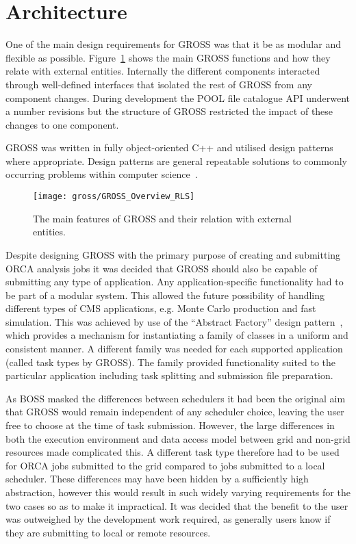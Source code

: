 \section{Architecture}
One of the main design requirements for GROSS was that it be as modular and flexible as possible. Figure~\ref{fig:Orca_Overview} shows the main GROSS functions and how they relate with external entities. Internally the different components interacted through well-defined interfaces that isolated the rest of GROSS from any component changes. During development the POOL file catalogue API underwent a number revisions but the structure of GROSS restricted the impact of these changes to one component.

GROSS was written in fully object-oriented C++ and utilised design patterns where appropriate. Design patterns are general repeatable solutions to commonly occurring problems within computer science~\cite{citeulike:115158}. 

\begin{figure}[!tbp]
  \texttt{[image: gross/GROSS\_Overview\_RLS]}
  \caption{The main features of GROSS and their relation with external entities.~\cite{CHEP04_TALLINI}
  \label{fig:Orca_Overview}}
\end{figure}

Despite designing GROSS with the primary purpose of creating and submitting ORCA analysis jobs it was decided that GROSS should also be capable of submitting any type of application. Any application-specific functionality had to be part of a modular system. This allowed the future possibility of handling different types of CMS applications, e.g. Monte Carlo production and fast simulation. This was achieved by use of the ``Abstract Factory'' design pattern~\cite{citeulike:115158}, which provides a mechanism for instantiating a family of classes in a uniform and consistent manner. A different family was needed for each supported application (called task types by GROSS). The family provided functionality suited to the particular application including task splitting and submission file preparation.

As BOSS masked the differences between schedulers it had been the original aim that GROSS would remain independent of any scheduler choice, leaving the user free to choose at the time of task submission. However, the large differences in both the execution environment and data access model between grid and non-grid resources made complicated this. A different task type therefore had to be used for ORCA jobs submitted to the grid compared to jobs submitted to a local scheduler. These differences may have been hidden by a sufficiently high abstraction, however this would result in such widely varying requirements for the two cases so as to make it impractical. It was decided that the benefit to the user was outweighed by the development work required, as generally users know if they are submitting to local or remote resources.

